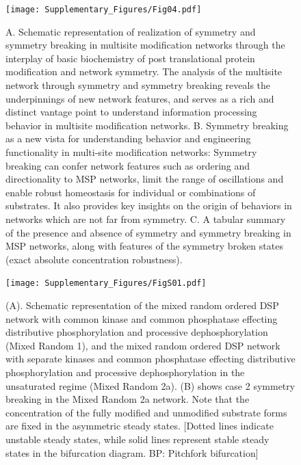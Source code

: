 \documentclass[16pt, a4paper]{article}
\newcommand{\beginsupplement}{%
        \setcounter{figure}{0}
        \renewcommand{\thefigure}{\arabic{figure}}%
        \renewcommand{\figurename}{Appendix 2 figure}
     }
\begin{document}
\clearpage
\begin{figure}[h!]
    \centering
    \texttt{[image: Supplementary\_Figures/Fig04.pdf]}
    \caption{A. Schematic representation of realization of symmetry and symmetry breaking in multisite modification networks through the interplay of basic biochemistry of post translational protein modification and network symmetry. The analysis of the multisite network through symmetry and symmetry breaking reveals the underpinnings of new network features, and serves as a rich and distinct vantage point to understand information processing behavior in multisite modification networks. B. Symmetry breaking as a new vista for understanding behavior and engineering functionality in multi-site modification networks: Symmetry breaking can confer network features such as ordering and directionality to MSP networks, limit the range of oscillations and enable robust homeostasis for individual or combinations of substrates.
    It also provides key insights on the origin of behaviors in networks which are not far from symmetry. C. A tabular summary of the presence and absence of symmetry and symmetry breaking in MSP networks, along with features of the symmetry broken states (exact absolute concentration robustness).}
    \label{Fig 4}
\end{figure}

\clearpage
\beginsupplement

\begin{figure}[ht!]
    \centering
    \texttt{[image: Supplementary\_Figures/FigS01.pdf]}
    \caption{(A). Schematic representation of the mixed random ordered DSP network with common kinase and common phosphatase effecting distributive  phosphorylation and processive dephosphorylation (Mixed Random 1), and the mixed random ordered DSP network with separate kinases and common phosphatase effecting distributive phosphorylation and processive dephosphorylation in the unsaturated regime (Mixed Random 2a). (B) shows case 2 symmetry breaking in the Mixed Random 2a network. Note that the concentration of the fully modified and unmodified substrate forms are fixed in the asymmetric steady states.
    [Dotted lines indicate unstable steady states, while solid lines represent stable steady states in the bifurcation diagram. BP: Pitchfork bifurcation]}
    \label{Fig S1}
\end{figure}
\end{document}

